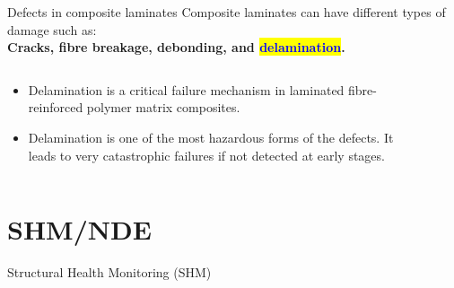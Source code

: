 \documentclass[10pt,aspectratio=169,dvipsnames]{beamer} %
\begin{document}
\begin{frame}{Defects in composite laminates}
	\small
	Composite laminates can have different types of damage such as: \\
	\textbf{Cracks, fibre breakage, debonding, and \colorbox{yellow}{\textcolor{blue}{delamination}}.} 
	\begin{columns}[T]
		\begin{column}[c]{.40\textwidth}
			\begin{itemize}
				\footnotesize
				\item Delamination is a critical failure mechanism in laminated fibre-reinforced polymer matrix composites.
				\item Delamination is one of the most hazardous forms of the defects. 
				It leads to very catastrophic failures if not detected at early stages.
			\end{itemize}
		\end{column}
		\hfill
		\begin{column}[c]{0.50\textwidth}
			\begin{figure}
			\end{figure}
		\end{column}
	\end{columns}	
\end{frame}

\section{SHM/NDE}
\begin{frame}{Structural Health Monitoring (SHM)}
	\begin{figure}
	\end{figure}
\end{frame}
\end{document}
